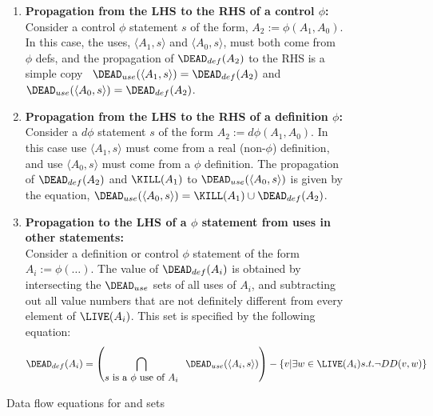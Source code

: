 \begin{figure}
\begin{enumerate}
\item {\bf Propagation from the LHS to the RHS of a control $\phi$:}\\
Consider a control $\phi$ statement $s$ of the form, $A_2  := \phi(A_1,A_0)$.
In this case, the 
uses, $\langle A_1, s \rangle$ and $\langle A_0, s \rangle$, must both come from $\phi$ defs, and 
the propagation of $\DEAD_{def}(A_2)$ to the RHS is a simple copy
\ie\
$\DEAD_{use}(\langle A_1,s \rangle) = \DEAD_{def}(A_2)$ and
$\DEAD_{use}(\langle A_0,s \rangle) = \DEAD_{def}(A_2)$.

\item {\bf Propagation from the LHS to the RHS of a definition $\phi$:}\\
Consider a $d\phi$ statement $s$ of the form $A_2 := d\phi(A_1, A_0)$.
In this case use
$\langle A_1,s \rangle$ must come from a real (non-$\phi$) definition, and use $\langle A_0,s \rangle$  must
come from a $\phi$ definition.  The propagation
of $\DEAD_{def}(A_2)$ and $\KILL(A_1)$ to
$\DEAD_{use}(\langle A_0,s \rangle)$ is given by the equation,
$
\DEAD_{use}(\langle A_0,s \rangle) = \KILL(A_1) \cup \DEAD_{def}(A_2)
$.

\item {\bf Propagation to the LHS of a $\phi$ statement from uses
in other statements:}\\
Consider a definition or control $\phi$ statement of the form $A_i := \phi(\ldots)$.  The value of $\DEAD_{def}(A_i)$ is obtained by intersecting
the $\DEAD_{use}$
sets of all uses of
$A_i$, and subtracting out all value numbers that are not definitely different 
from every element of $\LIVE(A_i)$. 
This set is specified by the following equation:
$$
\DEAD_{def}(A_i) = \left(\bigcap_{\mbox{$s$ is a $\phi$ use of $A_i$}} \;\; \DEAD_{use}(\langle A_i,s \rangle)
\right) - \{ v | \exists w \in \LIVE(A_i) s.t. \neg DD(v,w) \}
$$
\end{enumerate}
\caption{Data flow equations for  and 
 sets}
\label{fig:dead}
\end{figure}


